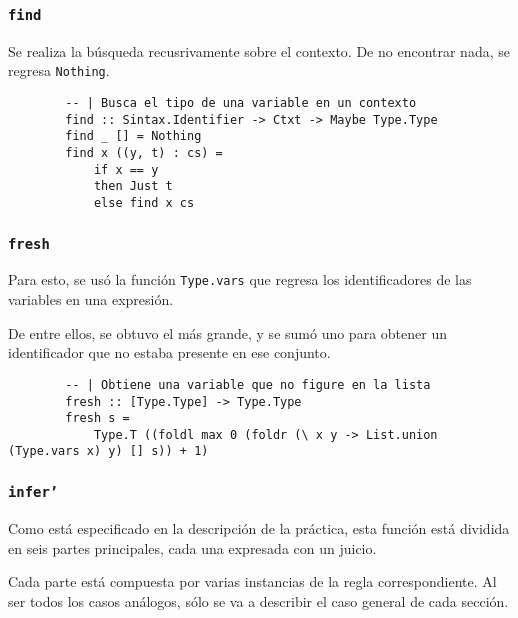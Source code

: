 \documentclass{article}
\begin{document}
    \subsubsection{\texttt{find}}

    Se realiza la búsqueda recusrivamente sobre el contexto. De no encontrar
    nada, se regresa \texttt{Nothing}.

    \begin{verbatim}
        -- | Busca el tipo de una variable en un contexto
        find :: Sintax.Identifier -> Ctxt -> Maybe Type.Type
        find _ [] = Nothing
        find x ((y, t) : cs) = 
            if x == y 
            then Just t
            else find x cs
    \end{verbatim}

    \subsubsection{\texttt{fresh}}

    Para esto, se usó la función \texttt{Type.vars} que regresa los
    identificadores de las variables en una expresión.

    De entre ellos, se obtuvo el más grande, y se sumó uno para obtener un
    identificador que no estaba presente en ese conjunto.

    \begin{verbatim}
        -- | Obtiene una variable que no figure en la lista
        fresh :: [Type.Type] -> Type.Type
        fresh s = 
            Type.T ((foldl max 0 (foldr (\ x y -> List.union (Type.vars x) y) [] s)) + 1)
    \end{verbatim}

    \subsubsection{\texttt{infer'}}

    Como está especificado en la descripción de la práctica, esta función está
    dividida en seis partes principales, cada una expresada con un juicio.

    Cada parte está compuesta por varias instancias de la regla correspondiente.
    Al ser todos los casos análogos, sólo se va a describir el caso general de
    cada sección.
\end{document}

